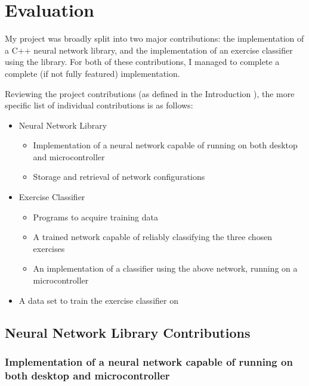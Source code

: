 \documentclass[a4paper]{article}
\begin{document}
\newpage
\section{Evaluation}

My project was broadly split into two major contributions: the implementation of a C++ neural network library, and the implementation of an exercise classifier using the library. For both of these contributions, I managed to complete a complete (if not fully featured) implementation.

Reviewing the project contributions (as defined in the Introduction ), the more specific list of individual contributions is as follows:

\begin{itemize}
\item Neural Network Library 
  \begin{itemize}
  \item Implementation of a neural network capable of running on  both desktop and microcontroller
    \item Storage and retrieval of network configurations
  \end{itemize}
\item Exercise Classifier
  \begin{itemize}
  \item Programs to acquire training data
    \item A trained network capable of reliably classifying the three chosen exercises
    \item An implementation of a classifier using the above network, running on a microcontroller
  \end{itemize}
\item A data set to train the exercise classifier on
\end{itemize}

\subsection{Neural Network Library Contributions}%

\subsubsection{Implementation of a neural network capable of running on  both desktop and microcontroller}
\end{document}
